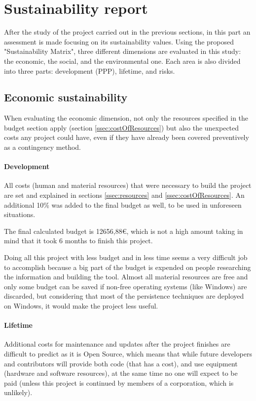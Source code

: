 \section{Sustainability report}
After the study of the project carried out in the previous sections, in this part an assessment is made focusing on its sustainability values. Using the proposed "Sustainability Matrix"\cite{susMatrix}, three different dimensions are evaluated in this study: the economic, the social, and the environmental one.
Each area is also divided into three parts: development (PPP), lifetime, and risks.


\subsection{Economic sustainability}
When evaluating the economic dimension, not only the resources specified in the budget section apply (section \ref{ssec:costOfResources}) but also the unexpected costs any project could have, even if they have already been covered preventively as a contingency method.

\paragraph{Development}
All costs (human and material resources) that were necessary to build the project are set and explained in sections \ref{ssec:resources} and \ref{ssec:costOfResources}. An additional 10\% was added to the final budget as well, to be used in unforeseen situations.

The final calculated budget is 12656,88€, which is not a high amount taking in mind that it took 6 months to finish this project.

Doing all this project with less budget and in less time seems a very difficult job to accomplish because a big part of the budget is expended on people researching the information and building the tool. Almost all material resources are free and only some budget can be saved if non-free operating systems (like Windows) are discarded, but considering that most of the persistence techniques are deployed on Windows, it would make the project less useful.

\paragraph{Lifetime}
Additional costs for maintenance and updates after the project finishes are difficult to predict as it is Open Source, which means that while future developers and contributors will provide both code (that has a cost), and use equipment (hardware and software resources), at the same time no one will expect to be paid (unless this project is continued by members of a corporation, which is unlikely).   

